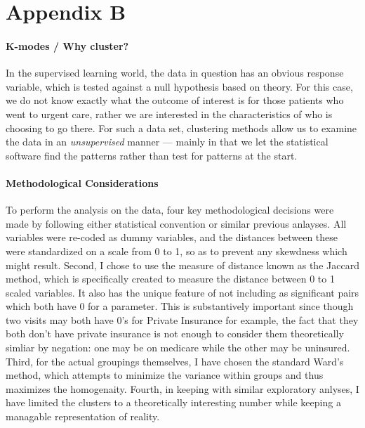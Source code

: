 \documentclass[12pt,twoside]{reedthesis}
\begin{document}
  \chapter*{Appendix B}\label{appendix-b}
  
  \doublespacing
  
  \subsubsection*{K-modes / Why cluster?}\label{k-modes-why-cluster}
  
  In the supervised learning world, the data in question has an obvious
  response variable, which is tested against a null hypothesis based on
  theory. For this case, we do not know exactly what the outcome of
  interest is for those patients who went to urgent care, rather we are
  interested in the characteristics of who is choosing to go there. For
  such a data set, clustering methods allow us to examine the data in an
  \emph{unsupervised} manner --- mainly in that we let the statistical
  software find the patterns rather than test for patterns at the start.
  
  \subsubsection*{Methodological
  Considerations}\label{methodological-considerations}
  
  To perform the analysis on the data, four key methodological decisions
  were made by following either statistical convention or similar previous
  anlayses. All variables were re-coded as dummy variables, and the
  distances between these were standardized on a scale from 0 to 1, so as
  to prevent any skewdness which might result. Second, I chose to use the
  measure of distance known as the Jaccard method, which is specifically
  created to measure the distance between 0 to 1 scaled variables. It also
  has the unique feature of not including as significant pairs which both
  have 0 for a parameter. This is substantively important since though two
  visits may both have 0's for Private Insurance for example, the fact
  that they both don't have private insurance is not enough to consider
  them theoretically simliar by negation: one may be on medicare while the
  other may be uninsured. Third, for the actual groupings themselves, I
  have chosen the standard Ward's method, which attempts to minimize the
  variance within groups and thus maximizes the homogenaity. Fourth, in
  keeping with similar exploratory anlyses, I have limited the clusters to
  a theoretically interesting number while keeping a managable
  representation of reality.
  
\end{document}
